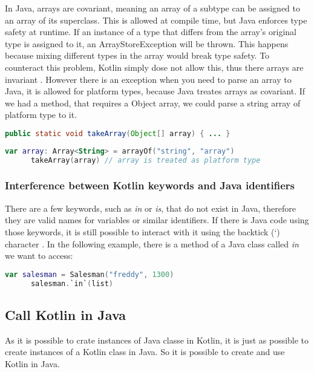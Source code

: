 \documentclass[a4paper, 11pt]{article}
\begin{document}
    In Java, arrays are covariant, meaning an array of a subtype can be assigned to an array of its superclass. This is allowed at compile time, but Java enforces type safety at runtime. If an instance of a type that differs from the array's original type is assigned to it, an ArrayStoreException will be thrown. This happens because mixing different types in the array would break type safety. To counteract this problem, Kotlin simply dose not allow this, thus there arrays are invariant \cite{interop-arrays}. However there is an exception when you need to parse an array to Java, it is allowed for platform types, because Java treates arrays as covariant. If we had a method, that requires a Object array, we could parse a string array of platform type to it.
    \begin{lstlisting}[language=Java]
      public static void takeArray(Object[] array) { ... }
    \end{lstlisting}
    \begin{lstlisting}[language=Kotlin]
      var array: Array<String> = arrayOf("string", "array")
      takeArray(array) // array is treated as platform type
    \end{lstlisting}

  \subsubsection{Interference between Kotlin keywords and Java identifiers}
    There are a few keywords, such as \textit{in} or \textit{is}, that do not exist in Java, therefore they are valid names for variables or similar identifiers. If there is Java code using those keywords, it is still possible to interact with it using the backtick (`) character \cite{interop-escaping-identifiers}. In the following example, there is a method of a Java class called \textit{in} we want to access:
    \begin{lstlisting}[language=Kotlin]
      var salesman = Salesman("freddy", 1300)
      salesman.`in`(list)
    \end{lstlisting}

\subsection{Call Kotlin in Java}
  As it is possible to crate instances of Java classe in Kotlin, it is just as possible to create instances of a Kotlin class in Java. So it is possible to create and use Kotlin in Java.
\end{document}
